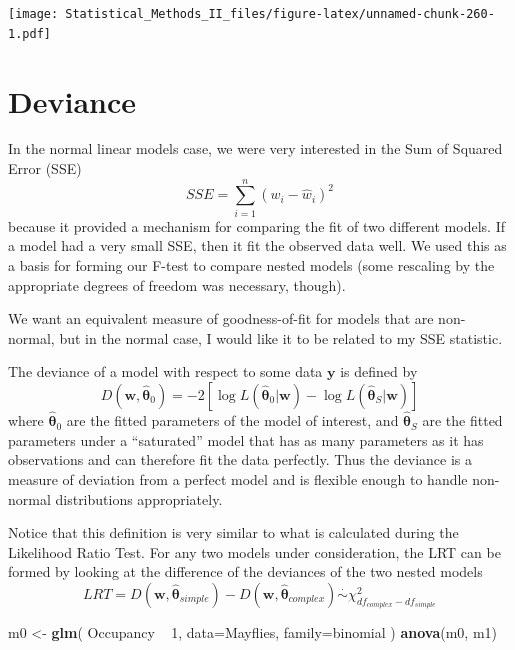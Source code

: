\documentclass[]{book}
\newenvironment{Shaded}{\begin{snugshade}}{\end{snugshade}}
\newcommand{\KeywordTok}[1]{\textcolor[rgb]{0.13,0.29,0.53}{\textbf{{#1}}}}
\newcommand{\DataTypeTok}[1]{\textcolor[rgb]{0.13,0.29,0.53}{{#1}}}
\newcommand{\DecValTok}[1]{\textcolor[rgb]{0.00,0.00,0.81}{{#1}}}
\newcommand{\StringTok}[1]{\textcolor[rgb]{0.31,0.60,0.02}{{#1}}}
\newcommand{\NormalTok}[1]{{#1}}
\theoremstyle{definition}
\theoremstyle{definition}
\theoremstyle{remark}
\begin{document}
\texttt{[image: Statistical\_Methods\_II\_files/figure-latex/unnamed-chunk-260-1.pdf]}

\section{Deviance}\label{deviance}

In the normal linear models case, we were very interested in the Sum of
Squared Error (SSE)
\[SSE=\sum_{i=1}^{n}\left(w_{i}-\hat{w}_{i}\right)^{2}\] because it
provided a mechanism for comparing the fit of two different models. If a
model had a very small SSE, then it fit the observed data well. We used
this as a basis for forming our F-test to compare nested models (some
rescaling by the appropriate degrees of freedom was necessary, though).

We want an equivalent measure of goodness-of-fit for models that are
non-normal, but in the normal case, I would like it to be related to my
SSE statistic.

The deviance of a model with respect to some data \(\boldsymbol{y}\) is
defined by
\[D\left(\boldsymbol{w},\hat{\boldsymbol{\theta}}_{0}\right) = -2\left[\log L\left(\hat{\boldsymbol{\theta}}_{0}|\boldsymbol{w}\right)-\log L\left(\hat{\boldsymbol{\theta}}_{S}|\boldsymbol{w}\right)\right]\]
where \(\hat{\boldsymbol{\theta}}_{0}\) are the fitted parameters of the
model of interest, and \(\hat{\boldsymbol{\theta}}_{S}\) are the fitted
parameters under a ``saturated'' model that has as many parameters as it
has observations and can therefore fit the data perfectly. Thus the
deviance is a measure of deviation from a perfect model and is flexible
enough to handle non-normal distributions appropriately.

Notice that this definition is very similar to what is calculated during
the Likelihood Ratio Test. For any two models under consideration, the
LRT can be formed by looking at the difference of the deviances of the
two nested models
\[LRT=D\left(\boldsymbol{w},\hat{\boldsymbol{\theta}}_{simple}\right)-D\left(\boldsymbol{w},\hat{\boldsymbol{\theta}}_{complex}\right)\stackrel{\cdot}{\sim}\chi_{df_{complex}-df_{simple}}^{2}\]

\begin{Shaded}
\begin{Highlighting}[]
\NormalTok{m0 <-}\StringTok{ }\KeywordTok{glm}\NormalTok{( Occupancy ~}\StringTok{ }\DecValTok{1}\NormalTok{, }\DataTypeTok{data=}\NormalTok{Mayflies, }\DataTypeTok{family=}\NormalTok{binomial )}
\KeywordTok{anova}\NormalTok{(m0, m1)}
\end{Highlighting}
\end{Shaded}
\end{document}
